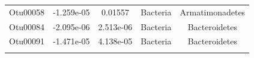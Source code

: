 \documentclass[]{article}
\begin{document}
\begin{longtable}[]{@{}ccccc@{}}
\begin{minipage}[t]{0.13\columnwidth}\centering\strut
Otu00058\strut
\end{minipage} & \begin{minipage}[t]{0.16\columnwidth}\centering\strut
-1.259e-05\strut
\end{minipage} & \begin{minipage}[t]{0.14\columnwidth}\centering\strut
0.01557\strut
\end{minipage} & \begin{minipage}[t]{0.13\columnwidth}\centering\strut
Bacteria\strut
\end{minipage} & \begin{minipage}[t]{0.27\columnwidth}\centering\strut
Armatimonadetes\strut
\end{minipage}\tabularnewline
\begin{minipage}[t]{0.13\columnwidth}\centering\strut
Otu00084\strut
\end{minipage} & \begin{minipage}[t]{0.16\columnwidth}\centering\strut
-2.095e-06\strut
\end{minipage} & \begin{minipage}[t]{0.14\columnwidth}\centering\strut
2.513e-06\strut
\end{minipage} & \begin{minipage}[t]{0.13\columnwidth}\centering\strut
Bacteria\strut
\end{minipage} & \begin{minipage}[t]{0.27\columnwidth}\centering\strut
Bacteroidetes\strut
\end{minipage}\tabularnewline
\begin{minipage}[t]{0.13\columnwidth}\centering\strut
Otu00091\strut
\end{minipage} & \begin{minipage}[t]{0.16\columnwidth}\centering\strut
-1.471e-05\strut
\end{minipage} & \begin{minipage}[t]{0.14\columnwidth}\centering\strut
4.138e-05\strut
\end{minipage} & \begin{minipage}[t]{0.13\columnwidth}\centering\strut
Bacteria\strut
\end{minipage} & \begin{minipage}[t]{0.27\columnwidth}\centering\strut
Bacteroidetes\strut
\end{minipage}\tabularnewline
\begin{minipage}[t]{0.13\columnwidth}\centering\strut

\end{minipage}
\end{longtable}
\end{document}
